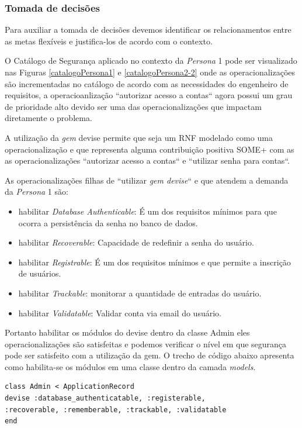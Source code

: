 \subsubsection{Tomada de decisões}

Para auxiliar a tomada de decisões devemos identificar os relacionamentos entre as metas flexíveis e justifica-los de acordo com o contexto.

O Catálogo de Segurança aplicado no contexto da \textit{Persona} 1 pode ser visualizado  nas Figuras \ref{catalogoPersona1} e \ref{catalogoPersona2-2} onde as operacionalizações são incrementadas no catálogo de acordo com as necessidades do engenheiro de requisitos, a operacioanlização ``autorizar acesso a contas`` agora possui um grau de prioridade alto devido ser uma das operacionalizações que impactam diretamente o problema.

A utilização da \textit{gem} devise permite que seja um RNF modelado como uma operacionalização e que representa alguma contribuição positiva SOME+ com as as operacionalizações ``autorizar acesso a contas`` e ``utilizar senha para contas``. 

As operacionalizações filhas de ``utilizar \textit{gem devise}`` e que atendem a demanda da \textit{Persona} 1 são:

\begin{itemize}
	\item habilitar \textit{Database Authenticable}: É um dos requisitos mínimos para que ocorra a persistência da senha no banco de dados.
	\item habilitar \textit{Recoverable}: Capacidade de redefinir a senha do usuário.
	\item habilitar \textit{Registrable}: É um dos requisitos mínimos e que permite a inscrição de usuários. 
	\item habilitar \textit{Trackable}: monitorar a quantidade de entradas do usuário. 
	\item habilitar \textit{Validatable}: Validar conta via email do usuário. 
\end{itemize}

Portanto habilitar os módulos do devise dentro da classe Admin eles operacionalizações são satisfeitas e podemos verificar o nível em que segurança pode ser satisfeito com a utilização da gem. O trecho de código abaixo apresenta como habilita-se os módulos em uma classe dentro da camada \textit{models}. 

\begin{lstlisting} 
class Admin < ApplicationRecord
devise :database_authenticatable, :registerable,
:recoverable, :rememberable, :trackable, :validatable
end
\end{lstlisting} 

